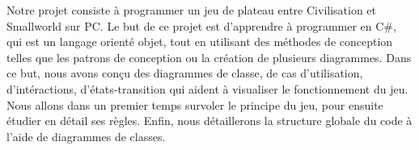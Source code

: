 Notre projet consiste à programmer un jeu de plateau entre Civilisation et Smallworld sur PC. Le but de ce projet est d'apprendre à programmer en C\#, qui est un langage orienté objet, tout en utilisant des méthodes de conception telles que les patrons de conception ou la création de plusieurs diagrammes. Dans ce but, nous avons conçu des diagrammes de classe, de cas d'utilisation, d'intéractions, d'états-transition qui aident à visualiser le fonctionnement du jeu.
Nous allons dans un premier temps survoler le principe du jeu, pour ensuite étudier en détail ses règles. Enfin, nous détaillerons la structure globale du code à l'aide de diagrammes de classes.
